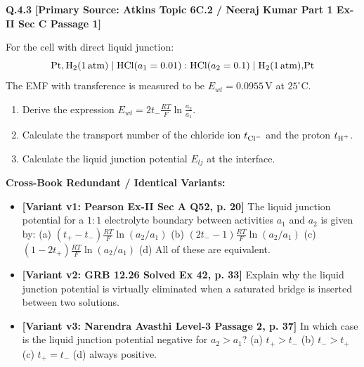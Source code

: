 \begin{problembox}
\textbf{Q.4.3} \hfill \textbf{[Primary Source: Atkins Topic 6C.2 / Neeraj Kumar Part 1 Ex-II Sec C Passage 1]}
\label{q:qb-c4-03}

For the cell with direct liquid junction:
\begin{equation*}
    \ce{Pt, H2}(1\,\text{atm}) \mid \ce{HCl}(a_1 = 0.01) : \ce{HCl}(a_2 = 0.1) \mid \ce{H2}(1\,\text{atm})\ce{, Pt}
\end{equation*}
The EMF with transference is measured to be $E_{wt} = 0.0955\,\text{V}$ at $25^\circ\text{C}$.
\begin{enumerate}[label=(\alph*)]
    \item Derive the expression $E_{wt} = 2t_- \frac{RT}{F}\ln \frac{a_2}{a_1}$.
    \item Calculate the transport number of the chloride ion $t_{\ce{Cl-}}$ and the proton $t_{\ce{H+}}$.
    \item Calculate the liquid junction potential $E_{lj}$ at the interface.
\end{enumerate}

\tcbline
\textbf{\color{accentamber}Cross-Book Redundant / Identical Variants:}
\begin{itemize}[leftmargin=*,itemsep=2pt]
    \item \textbf{[Variant v1: Pearson Ex-II Sec A Q52, p. 20]} The liquid junction potential for a $1:1$ electrolyte boundary between activities $a_1$ and $a_2$ is given by: (a) $(t_+ - t_-)\frac{RT}{F}\ln(a_2/a_1)$ (b) $(2t_- - 1)\frac{RT}{F}\ln(a_2/a_1)$ (c) $(1 - 2t_+)\frac{RT}{F}\ln(a_2/a_1)$ (d) All of these are equivalent.
    \item \textbf{[Variant v2: GRB  12.26 Solved Ex 42, p. 33]} Explain why the liquid junction potential is virtually eliminated when a saturated  bridge is inserted between two solutions.
    \item \textbf{[Variant v3: Narendra Avasthi Level-3 Passage 2, p. 37]} In which case is the liquid junction potential negative for $a_2 > a_1$? (a) $t_+ > t_-$ (b) $t_- > t_+$ (c) $t_+ = t_-$ (d) always positive.
\end{itemize}
\end{problembox}
